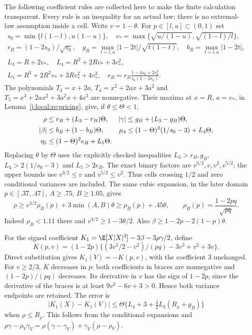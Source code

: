 The following coefficient rules are collected here to make the finite
calculation transparent. Every rule is an inequality for an actual law;
there is no extremal-law assumption inside a cell.
Write $v=1-\theta$. For $p\in[l,u]\subset(0,1)$ set
\begin{gather*}
 s_0=\min\{l(1-l),u(1-u)\},\quad
 v_* =\max\{\sqrt{u/(1-u)},\sqrt{(1-l)/l}\},\\
 r_B=(1-2s_0)/\sqrt{s_0},\quad
 g_B=\max_{t=l,u}|1-2t|/\sqrt{t(1-t)},\quad b_B=\max_{t=l,u}|1-2t|,\\
 L_3=R+2v_*,\quad L_4=R^2+2Rv_*+3v_*^2,\\
 L_5=R^3+2R^2v_*+3Rv_*^2+4v_*^3,\quad
 e_B=r_B\frac{1-4s_0+2s_0^2}{s_0(1-2s_0)}.
\end{gather*}
The polynomials $T_3=x+2a$, $T_4=x^2+2ax+3a^2$ and
$T_5=x^3+2ax^2+3a^2x+4a^3$ are nonnegative. Their maxima at
$x=R$, $a=v_*$, in Lemma~\ref{j:local:re:pricing}, give, if $\theta\le\Theta<1$,
\begin{align}
 \rho&\le r_B+(L_3-r_B)\Theta,&
 |\gamma|&\le g_B+(L_3-g_B)\Theta,\notag\\
 |\beta|&\le b_B+(1-b_B)\Theta,&
 \mu_4&\le(1-\Theta)^2(1/s_0-3)+L_4\Theta,\notag\\
 \eta_5&\le(1-\Theta)^2e_B+L_5\Theta.&&\label{j:local:mom:boxes}
\end{align}
Replacing $\theta$ by $\Theta$ uses the explicitly checked inequalities
$L_3>r_B,g_B$, $L_4>2(1/s_0-3)$ and $L_5>2e_B$.
The exact binary factors are $v^{3/2},v,v^2,v^{5/2}$; the upper bounds
use $v^{3/2}\le v$ and $v^{5/2}\le v^2$. Thus cells crossing $1/2$ and
zero conditional variances are included. The same cubic expansion, in the
later domain $p\in[.37,.47]$, $A\ge.75$, $B\ge1.05$, gives
\begin{equation}\label{j:local:mom:rho-lower}
 \rho\ge v^{3/2}\rho_B(p)+3\min(A,B)\theta
       \ge\rho_B(p)+.45\theta,\qquad
 \rho_B(p)=\frac{1-2pq}{\sqrt{pq}}.
\end{equation}
Indeed $\rho_B<1.11$ there and $v^{3/2}\ge1-3\theta/2$.
Also $\beta\ge1-2p-2(1-p)\theta$.

For the signed coefficient
$K_1=\E[X|X|^3]-3\beta-3\rho\gamma/2$, define
\[
 K(p,v)=(1-2p)\{(3v^3/2-v^2)/(pq)-3v^3+v^2+3v\}.
\]
Direct substitution gives $K_1(V)=-K(p,v)$, with the coefficient $3$
unchanged. For $v\ge2/3$, $K$ decreases in $p$: both coefficients in
braces are nonnegative and $(1-2p)/(pq)$ decreases. Its derivative in $v$
has the sign of $1-2p$, since the derivative of the braces is at least
$9v^2-6v+3>0$. Hence both variance endpoints are retained. The error is
\begin{equation}\label{j:local:mom:K-error}
 |K_1(X)-K_1(V)|\le
 \Theta\{L_4+3+\tfrac32L_3(R_\rho+g_B)\}
\end{equation}
when $\rho\le R_\rho$. This follows from the conditional expansions and
$\rho\gamma-\rho_V\gamma_V=
\rho(\gamma-\gamma_V)+\gamma_V(\rho-\rho_V)$.


